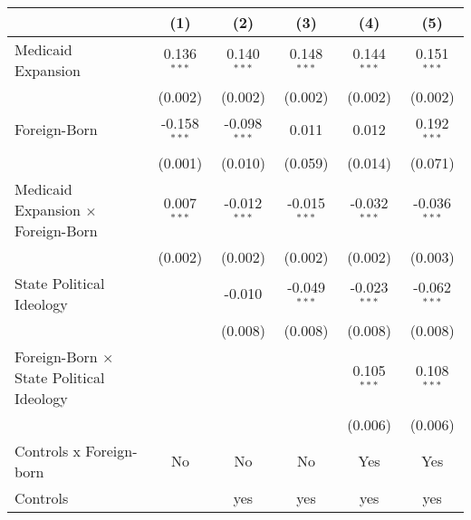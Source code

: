 \documentclass[
]{article}
\let\origtable\table
\let\endorigtable\endtable
\renewenvironment{table}[1][ht]{
      \expandafter\origtable\expandafter[H]
    }{
      \endorigtable
    }
\begin{document}
\begin{table}[htbp]
   \centering
   \begin{threeparttable}[b]
      \caption{The Effect of Medicaid Expansion on Uninsured Rate (Difference-in-Differences Estimation)}
      \begin{tabular}{lccccc}
         \tabularnewline \midrule \midrule
                                                         & (1)            & (2)            & (3)            & (4)            & (5)\\  
         \midrule 
         Medicaid Expansion                              & 0.136$^{***}$  & 0.140$^{***}$  & 0.148$^{***}$  & 0.144$^{***}$  & 0.151$^{***}$\\   
                                                         & (0.002)        & (0.002)        & (0.002)        & (0.002)        & (0.002)\\   
         Foreign-Born                                    & -0.158$^{***}$ & -0.098$^{***}$ & 0.011          & 0.012          & 0.192$^{***}$\\   
                                                         & (0.001)        & (0.010)        & (0.059)        & (0.014)        & (0.071)\\   
         Medicaid Expansion $\times$ Foreign-Born        & 0.007$^{***}$  & -0.012$^{***}$ & -0.015$^{***}$ & -0.032$^{***}$ & -0.036$^{***}$\\   
                                                         & (0.002)        & (0.002)        & (0.002)        & (0.002)        & (0.003)\\   
         State Political Ideology                        &                & -0.010         & -0.049$^{***}$ & -0.023$^{***}$ & -0.062$^{***}$\\   
                                                         &                & (0.008)        & (0.008)        & (0.008)        & (0.008)\\   
         Foreign-Born $\times$ State Political Ideology  &                &                &                & 0.105$^{***}$  & 0.108$^{***}$\\   
                                                         &                &                &                & (0.006)        & (0.006)\\   
         \midrule 
         Controls x Foreign-born                         & No             & No             & No             & Yes            & Yes\\  
         Controls                                        &                & yes            & yes            & yes            & yes\\  

\end{tabular}
\end{threeparttable}
\end{table}
\end{document}
